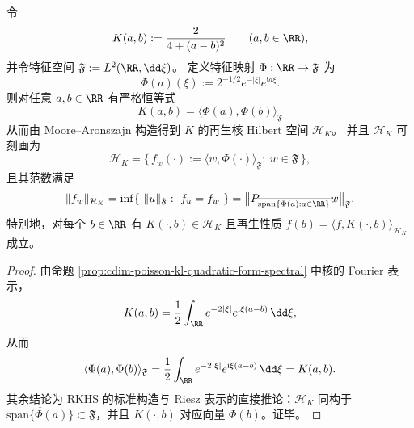 \begin{proposition}\label{prop:cdim-kernel-rkhs-feature-map}
令
\[
K(a,b):=\frac{2}{4+(a-b)^2}\qquad(a,b\in\RR),
\]
并令特征空间 \(\mathfrak F:=L^2(\RR,\dd\xi)\)。
定义特征映射 \(\Phi:\RR\to\mathfrak F\) 为
\[
\Phi(a)(\xi):=2^{-1/2}e^{-|\xi|}e^{\mathrm{i}a\xi}.
\]
则对任意 \(a,b\in\RR\) 有严格恒等式
\[
\boxed{\;
K(a,b)=\langle \Phi(a),\Phi(b)\rangle_{\mathfrak F}\;}
\]
从而由 Moore--Aronszajn 构造得到 \(K\) 的再生核 Hilbert 空间 \(\mathcal H_K\)。
并且 \(\mathcal H_K\) 可刻画为
\[
\mathcal H_K=\{\,f_w(\cdot):=\langle w,\Phi(\cdot)\rangle_{\mathfrak F}:\ w\in\mathfrak F\,\},
\]
且其范数满足
\[
\|f_w\|_{\mathcal H_K}
=\inf\{\ \|u\|_{\mathfrak F}:\ f_u=f_w\ \}
=\bigl\|P_{\overline{\mathrm{span}\{\Phi(a):a\in\RR\}}}w\bigr\|_{\mathfrak F}.
\]
特别地，对每个 \(b\in\RR\) 有 \(K(\cdot,b)\in\mathcal H_K\) 且再生性质 \(f(b)=\langle f,K(\cdot,b)\rangle_{\mathcal H_K}\) 成立。
\end{proposition}
\begin{proof}
由命题 \ref{prop:cdim-poisson-kl-quadratic-form-spectral} 中核的 Fourier 表示，
\[
K(a,b)=\frac12\int_{\RR}e^{-2|\xi|}e^{\mathrm{i}\xi(a-b)}\,\dd\xi,
\]
从而
\[
\langle \Phi(a),\Phi(b)\rangle_{\mathfrak F}
=\frac12\int_{\RR}e^{-2|\xi|}e^{\mathrm{i}\xi(a-b)}\,\dd\xi
=K(a,b).
\]
其余结论为 RKHS 的标准构造与 Riesz 表示的直接推论：\(\mathcal H_K\) 同构于 \(\overline{\mathrm{span}\{\Phi(a)\}}\subset\mathfrak F\)，并且 \(K(\cdot,b)\) 对应向量 \(\Phi(b)\)。证毕。
\end{proof}

